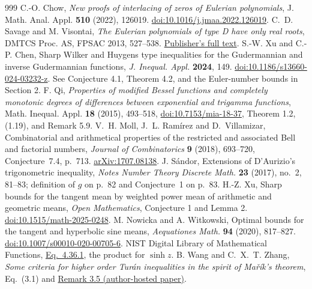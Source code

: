 \documentclass[11pt,a4paper]{article}
\begin{document}
\begin{thebibliography}{999}
C.-O. Chow, \emph{New proofs of interlacing of zeros of Eulerian polynomials}, J. Math. Anal. Appl. \textbf{510} (2022), 126019. \href{https://doi.org/10.1016/j.jmaa.2022.126019}{doi:10.1016/j.jmaa.2022.126019}.
C.~D. Savage and M. Visontai, \emph{The Eulerian polynomials of type D have only real roots}, DMTCS Proc. AS, FPSAC 2013, 527--538. \href{https://dmtcs.episciences.org/articles/2321/download}{Publisher's full text}.
S.-W. Xu and C.-P. Chen, Sharp Wilker and Huygens type inequalities for the Gudermannian and inverse Gudermannian functions, \emph{J. Inequal. Appl.} \textbf{2024}, 149. \href{https://doi.org/10.1186/s13660-024-03232-z}{doi:10.1186/s13660-024-03232-z}. See Conjecture 4.1, Theorem 4.2, and the Euler-number bounds in Section 2.
F. Qi, \emph{Properties of modified Bessel functions and completely
monotonic degrees of differences between exponential and trigamma
functions}, Math. Inequal. Appl. \textbf{18} (2015), 493--518,
\href{https://doi.org/10.7153/mia-18-37}{doi:10.7153/mia-18-37},
Theorem 1.2, (1.19), and Remark 5.9.
V.~H. Moll, J.~L. Ram\'irez and D.~Villamizar,
Combinatorial and arithmetical properties of the restricted and associated
Bell and factorial numbers, \emph{Journal of Combinatorics}
\textbf{9} (2018), 693--720, Conjecture~7.4, p.~713.
\href{https://arxiv.org/abs/1707.08138}{arXiv:1707.08138}.
J. S\'andor, Extensions of D'Aurizio's
trigonometric inequality, \emph{Notes Number Theory Discrete Math.}
\textbf{23} (2017), no.~2, 81--83; definition of $g$ on p.~82 and
Conjecture~1 on p.~83.
H.-Z. Xu, Sharp bounds for the tangent mean by weighted power mean of arithmetic and geometric means, \emph{Open Mathematics}, Conjecture 1 and Lemma 2.
\href{https://doi.org/10.1515/math-2025-0248}{doi:10.1515/math-2025-0248}.
M. Nowicka and A. Witkowski, Optimal bounds for the tangent and hyperbolic sine means, \emph{Aequationes Math.} \textbf{94} (2020), 817--827. \href{https://doi.org/10.1007/s00010-020-00705-6}{doi:10.1007/s00010-020-00705-6}.
NIST Digital Library of Mathematical Functions, \href{https://dlmf.nist.gov/4.36.E1}{Eq.\ 4.36.1}, the product for $\sinh z$.
B. Wang and C.~X.~T. Zhang, \textit{Some criteria for higher order Tur\'an
inequalities in the spirit of Ma\v{r}\'{i}k's theorem}, Eq.~(3.1) and
\href{https://cfc.nankai.edu.cn/_upload/article/files/7c/59/537dfc2d4ccc940465b4bb926c83/ded5d338-d5c2-4a81-9bed-54e7b8db797d.pdf#page=10}{Remark 3.5 (author-hosted paper)}.

\end{thebibliography}
\end{document}
